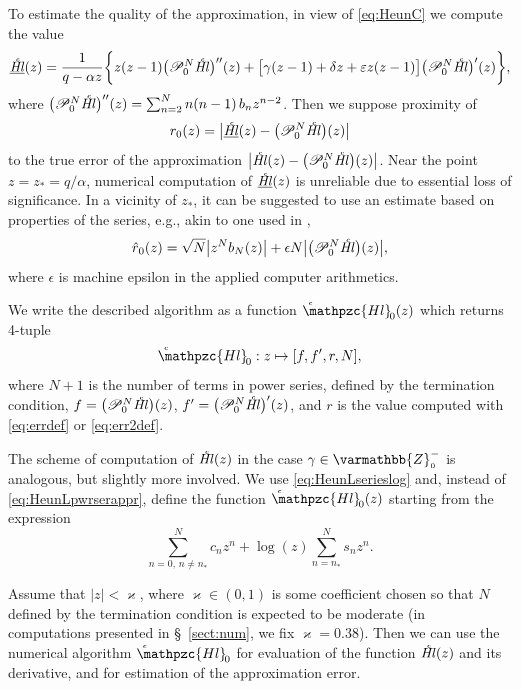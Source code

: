 \documentclass[11pt]{article}
\newcommand{\MF}[1]{\mathop{#1}\nolimits}
\newcommand{\Zzo}{\varmathbb{Z}_{\scriptscriptstyle0}^{-}}%
\def\nsp{n_*}%
\def\reservecoeff{\varkappa}
\def\HeunCl{\setbox0=\hbox{\tiny\itshape\bfseries \kern1.52mm c}\wd0=0pt\ht0=0pt\dp0=0pt\MF{\textit{\hbox{\raise1.67ex\copy0}Hl\/}}}%
\def\psHeunCl{\setbox0=\hbox{\tiny\itshape\bfseries \kern1.56mm c}\wd0=0pt\ht0=0pt\dp0=0pt\MF{\hbox{\raise1.67ex\copy0}\mathpzc{Hl}_{\!0}}}%
\begin{document}
To estimate the quality of the approximation, in view of \eqref{eq:HeunC} we
compute the value
\[
  \underline{\HeunCl}(z)=\frac{1}{q-\alpha z}\biggl\{z(z-1)\bigl(\mathscr{P}_0^N\!\HeunCl\bigr)''(z)+
  \bigl[\gamma(z-1)+\delta z+\varepsilon z(z-1)\bigr]\bigl(\mathscr{P}_0^N\!\HeunCl\bigr)'(z)\biggr\},
\]
where $\bigl(\mathscr{P}_0^N\!\HeunCl\bigr)''(z)=\sum_{n=2}^{N}n(n-1)\,b_n z^{n-2}$.
Then we suppose proximity of
\begin{equation}
\MF{r_0}(z)=\bigl|\underline{\HeunCl}(z)-\bigl(\mathscr{P}_0^N\!\HeunCl\bigr)(z)\bigr|
\label{eq:errdef}
\end{equation}
to the true error of the approximation
$\bigl|\HeunCl(z)-\bigl(\mathscr{P}_0^N\!\HeunCl\bigr)(z)\bigr|$.  Near the point
$z=z_*=q/\alpha$, numerical computation of $\underline{\HeunCl}(z)$ is unreliable due to essential loss of significance.  In a vicinity of $z_*$, it
can be suggested  to use an estimate based on properties of the series, e.g., akin to one used in \cite{mycode2}, 
\begin{equation}
\MF{\Hat{r}\vphantom{r}_0}(z)=
\sqrt{N}\bigl|z^Nb_N(z)\bigr| + \epsilon N \bigl|\bigl(\mathscr{P}_0^N\!\HeunCl\bigr)(z)\bigr|,
\label{eq:err2def}
\end{equation}
where $\epsilon$ is machine epsilon in the applied computer arithmetics.

We write the described algorithm as a function $\psHeunCl(z)$ which returns 4-tuple
\[
 \psHeunCl: z\mapsto [f,f',r,N],
\]
where $N+1$ is the number of terms in power series, defined by the termination
condition, $f=\bigl(\mathscr{P}_0^N\!\HeunCl\bigr)(z)$,
$f'=\bigl(\mathscr{P}_0^N\!\HeunCl\bigr)'(z)$, and $r$ is the value computed with \eqref{eq:errdef} or
\eqref{eq:err2def}.

The scheme of computation of $\HeunCl(z)$ in the case $\gamma\in\Zzo$
is analogous, but slightly more involved. We use
\eqref{eq:HeunLserieslog} and, instead of \eqref{eq:HeunLpwrserappr}, define the
function $\psHeunCl(z)$ starting from the expression
\[
\sum_{n=0,\,n\neq\nsp}^{N}\!\!c_n z^n +\log(z)\sum_{n=\nsp}^{N}s_n z^n.
\]

Assume that $|z|<\reservecoeff$, where  $\reservecoeff\in(0,1)$ is some coefficient chosen
so that $N$ defined by the termination condition is expected to be moderate (in computations presented in \S~\ref{sect:num}, we fix $\reservecoeff=0.38$). Then we can use the numerical algorithm $\psHeunCl$ for
evaluation of the function $\HeunCl(z)$ and its derivative, and for estimation of
the approximation error.
\end{document}
